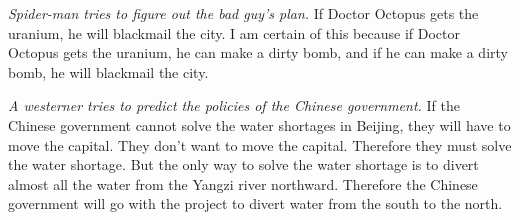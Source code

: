 \begin{practiceproblems}
\begin{earg}


\item  \emph{Spider-man tries to figure out the bad guy's plan.} If Doctor Octopus gets the uranium, he will blackmail the city. I am certain of this because if Doctor Octopus gets the uranium, he can make a dirty bomb, and if he can make a dirty bomb, he will blackmail the city.



\item \emph{A westerner tries to predict the policies of the Chinese government.} If the Chinese government cannot solve the water shortages in Beijing, they will have to move the capital. They don't want to move the capital. Therefore they must solve the water shortage. But the only way to solve the water shortage is to divert almost all the water from the Yangzi river northward. Therefore the Chinese government will go with the project to divert water from the south to the north.       





\end{earg}



\end{practiceproblems}


